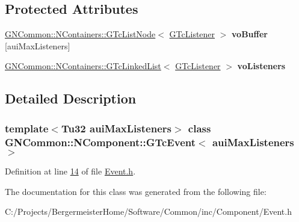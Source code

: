 \subsection*{Protected Attributes}
\begin{DoxyCompactItemize}
\item 
\mbox{\label{class_g_n_common_1_1_n_component_1_1_g_tc_event_ae060ae772a0689936a5ce21802e1766b}} 
\mbox{\hyperlink{class_g_n_common_1_1_n_containers_1_1_g_tc_list_node}{G\+N\+Common\+::\+N\+Containers\+::\+G\+Tc\+List\+Node}}$<$ \mbox{\hyperlink{class_g_n_common_1_1_n_component_1_1_g_tc_listener}{G\+Tc\+Listener}} $>$ {\bfseries vo\+Buffer} \mbox{[}aui\+Max\+Listeners\mbox{]}
\item 
\mbox{\label{class_g_n_common_1_1_n_component_1_1_g_tc_event_a4bdfc0245a63301bb4d6df850f066ef1}} 
\mbox{\hyperlink{class_g_n_common_1_1_n_containers_1_1_g_tc_linked_list}{G\+N\+Common\+::\+N\+Containers\+::\+G\+Tc\+Linked\+List}}$<$ \mbox{\hyperlink{class_g_n_common_1_1_n_component_1_1_g_tc_listener}{G\+Tc\+Listener}} $>$ {\bfseries vo\+Listeners}
\end{DoxyCompactItemize}


\subsection{Detailed Description}
\subsubsection*{template$<$Tu32 aui\+Max\+Listeners$>$\newline
class G\+N\+Common\+::\+N\+Component\+::\+G\+Tc\+Event$<$ aui\+Max\+Listeners $>$}



Definition at line \mbox{\hyperlink{_event_8h_source_l00014}{14}} of file \mbox{\hyperlink{_event_8h_source}{Event.\+h}}.



The documentation for this class was generated from the following file\+:\begin{DoxyCompactItemize}
\item 
C\+:/\+Projects/\+Bergermeister\+Home/\+Software/\+Common/inc/\+Component/Event.\+h\end{DoxyCompactItemize}
